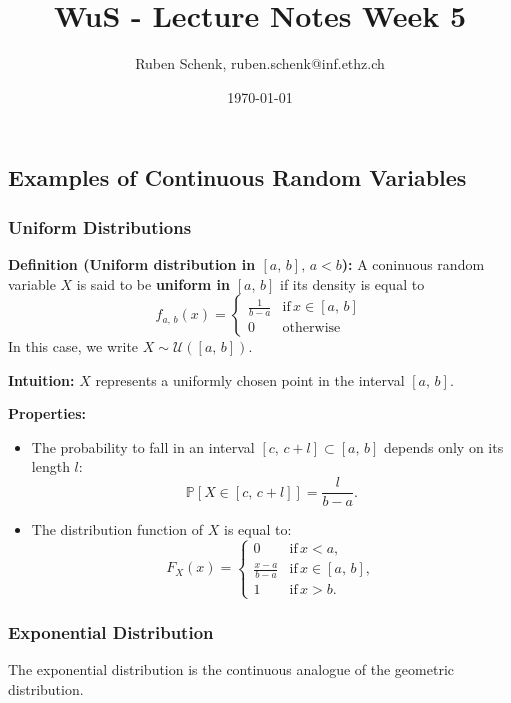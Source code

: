 \documentclass[a4paper]{extarticle}
\title{WuS - Lecture Notes Week 5}
\author{Ruben Schenk, ruben.schenk@inf.ethz.ch}
\date{\today}
\begin{document}
\maketitle
\newpage

\subsection{Examples of Continuous Random Variables}

\subsubsection{Uniform Distributions}

\textbf{Definition (Uniform distribution in \([a, \, b], \, a < b\)):} A coninuous random variable \(X\) is said to be \textbf{uniform in} \([a, \, b]\) if its density is equal to
\[
    f_{a, \, b}(x) = \begin{cases}
        \frac{1}{b - a} & \text{if} \, x \in [a, \, b]\\
        0 & \text{otherwise}
    \end{cases}
\]
In this case, we write \(X \sim \mathcal{U}([a, \, b])\).

\textbf{Intuition:} \(X\) represents a uniformly chosen point in the interval \([a, \, b]\).

\textbf{Properties:}
\begin{itemize}
    \item The probability to fall in an interval \([c, \, c + l] \subset [a, \, b]\) depends only on its length \(l\):
    \[
        \mathbb{P}[X \in [c, \, c + l]] = \frac{l}{b - a}.
    \]
    \item The distribution function of \(X\) is equal to:
    \[
        F_X(x) = \begin{cases}
            0 & \text{if} \, x < a,\\
            \frac{x-a}{b-a} & \text{if} \, x \in [a, \, b],\\
            1 & \text{if} \, x > b.
        \end{cases}
    \]
\end{itemize}

\subsubsection{Exponential Distribution}

The exponential distribution is the continuous analogue of the geometric distribution.
\end{document}
